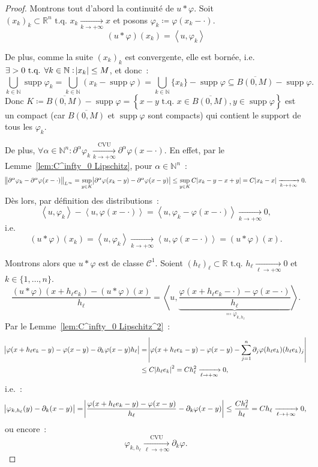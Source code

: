 \documentclass{report}
\DeclareMathOperator{\supp}{supp}
\newcommand{\R}{{\mathbb R}}
\newcommand{\N}{{\mathbb N}}
\newcommand{\scpr}[2]{\left\langle#1, #2\right\rangle}
\newcommand{\tq}{\text{ t.q. }}
\newcommand{\st}{\tq}
\newcommand{\pinfty}{{+\infty}}
\theoremstyle{definition}
\theoremstyle{remark}
\begin{document}
\begin{proof} Montrons tout d'abord la continuité de $u * \varphi$. Soit $(x_k)_k \subset \R^n \st x_k \xrightarrow[k \to \pinfty]{} x$ et posons
$\varphi_k \coloneqq \varphi(x_k-\cdot)$.
\[(u * \varphi)(x_k) = \scpr u{\varphi_k}\]

De plus, comme la suite $(x_k)_k$ est convergente, elle est bornée, i.e. $\exists > 0 \st \forall k \in \N : \abs {x_k} \leq M$, et donc~:
\[\bigcup_{k \in \N}\supp\varphi_k = \bigcup_{k \in \N}\left(x_k-\supp\varphi\right) = \bigcup_{k \in \N}\{x_k\} - \supp\varphi \subseteq \overline {B(0, M)} - \supp\varphi.\]
Donc $K \coloneqq \overline {B(0, M)} - \supp\varphi = \left\{x-y \st x \in \overline {B(0, M)}, y \in \supp\varphi\right\}$ est un compact (car $\overline {B(0, M)}$
et $\supp\varphi$ sont compacts) qui contient le support de tous les $\varphi_k$.

De plus, $\forall \alpha \in \N^n : \partial^\alpha\varphi_k \xrightarrow[k \to \pinfty]{\text{CVU}} \partial^\alpha\varphi(x-\cdot)$. En effet, par le
Lemme~\ref{lem:C^infty_0 Lipschitz}, pour $\alpha \in \N^n$~:
\[\norm {\partial^\alpha\varphi_k - \partial^\alpha\varphi(x-\cdot)}_{L^\infty} = \sup_{y \in K}\abs {\partial^\alpha\varphi(x_k-y) - \partial^\alpha\varphi(x-y)}
	\leq \sup_{y \in K}C\abs {x_k-y-x+y} = C\abs {x_k-x} \xrightarrow[k \to \pinfty]{} 0.\]
Dès lors, par définition des distributions~:
\[\scpr u{\varphi_k} - \scpr u{\varphi(x-\cdot)} = \scpr u{\varphi_k-\varphi(x-\cdot)} \xrightarrow[k \to \pinfty]{} 0,\]
i.e.
\[(u*\varphi)(x_k) = \scpr u{\varphi_k} \xrightarrow[k \to \pinfty]{} \scpr u{\varphi(x-\cdot)} = (u*\varphi)(x).\]

Montrons alors que $u * \varphi$ est de classe $\mathcal C^1$. Soient $(h_\ell)_\ell \subset \R \st h_\ell \xrightarrow[\ell \to \pinfty]{} 0$ et $k \in \{1, \ldots, n\}$.
\[\frac {(u*\varphi)(x+h_\ell e_k) - (u*\varphi)(x)}{h_\ell} = \scpr u{\underbrace {\frac {\varphi(x+h_\ell e_k - \cdot) - \varphi(x-\cdot)}{h_\ell}}_{\eqqcolon \varphi_{k,h_\ell}}}.\]
Par le Lemme~\ref{lem:C^infty_0 Lipschitz^2}~:
\begin{align*}
	\abs {\varphi(x+h_\ell e_k - y) - \varphi(x-y) - \partial_k\varphi(x-y)h_\ell}
			&= \abs {\varphi(x+h_\ell e_k - y) - \varphi(x-y) - \sum_{j=1}^n\partial_j\varphi(h_\ell e_k)(h_\ell e_k)_j} \\
	&\leq C\abs {h_\ell e_k}^2 = Ch_\ell^2 \xrightarrow[\ell \to \pinfty]{} 0,
\end{align*}
i.e.~:
\begin{equation}\label{eq:borne varphi_k,h ell - partial_k varphi}
	\abs {\varphi_{k,h_\ell}(y) - \partial_k(x-y)} = \abs {\frac {\varphi(x+h_\ell e_k - y) - \varphi(x-y)}{h_\ell} - \partial_k\varphi(x-y)}
	\leq \frac {Ch_\ell^2}{h_\ell} = Ch_\ell \xrightarrow[\ell \to \pinfty]{} 0,
\end{equation}
ou encore~:
\[\varphi_{k,h_\ell} \xrightarrow[\ell \to \pinfty]{\text{CVU}} \partial_k\varphi.\]


\end{proof}
\end{document}
